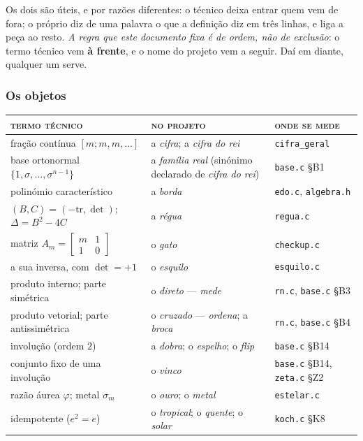 \documentclass[11pt]{article}
\newcommand{\code}[1]{\texttt{\small #1}}
\theoremstyle{plain}
\theoremstyle{remark}
\begin{document}
Os dois são úteis, e por razões diferentes: o técnico deixa entrar quem vem de fora; o próprio
diz de uma palavra o que a definição diz em três linhas, e liga a peça ao resto. \emph{A regra
que este documento fixa é de ordem, não de exclusão}: o termo técnico vem \textbf{à frente}, e o
nome do projeto vem a seguir. Daí em diante, qualquer um serve.

\subsubsection{Os objetos}

\begin{center}\small
\renewcommand{\arraystretch}{1.25}
\begin{tabular}{@{}p{4.6cm}p{5.2cm}p{4.8cm}@{}}
\toprule
\textsc{termo técnico} & \textsc{no projeto} & \textsc{onde se mede} \\
\midrule
fração contínua $[m;m,m,\dots]$ & a \emph{cifra}; a \emph{cifra do rei} & \code{cifra\_geral} \\
base ortonormal $\{1,\sigma,\dots,\sigma^{n-1}\}$ & a \emph{família real} (sinónimo declarado de \emph{cifra do rei}) & \code{base.c} §B1 \\
polinómio característico & a \emph{borda} & \code{edo.c}, \code{algebra.h} \\
$(B,C)=(-\mathrm{tr},\det)$; $\Delta=B^2-4C$ & a \emph{régua} & \code{regua.c} \\
matriz $A_m=\left[\begin{smallmatrix}m&1\\1&0\end{smallmatrix}\right]$ & o \emph{gato} & \code{checkup.c} \\
a sua inversa, com $\det=+1$ & o \emph{esquilo} & \code{esquilo.c} \\
produto interno; parte simétrica & o \emph{direto} --- \emph{mede} & \code{rn.c}, \code{base.c} §B3 \\
produto vetorial; parte antissimétrica & o \emph{cruzado} --- \emph{ordena}; a \emph{broca} & \code{rn.c}, \code{base.c} §B4 \\
involução (ordem $2$) & a \emph{dobra}; o \emph{espelho}; o \emph{flip} & \code{base.c} §B14 \\
conjunto fixo de uma involução & o \emph{vinco} & \code{base.c} §B14, \code{zeta.c} §Z2 \\
razão áurea $\varphi$; metal $\sigma_m$ & o \emph{ouro}; o \emph{metal} & \code{estelar.c} \\
idempotente ($e^2=e$) & o \emph{tropical}; o \emph{quente}; o \emph{solar} & \code{koch.c} §K8 \\

\end{tabular}
\end{center}
\end{document}
